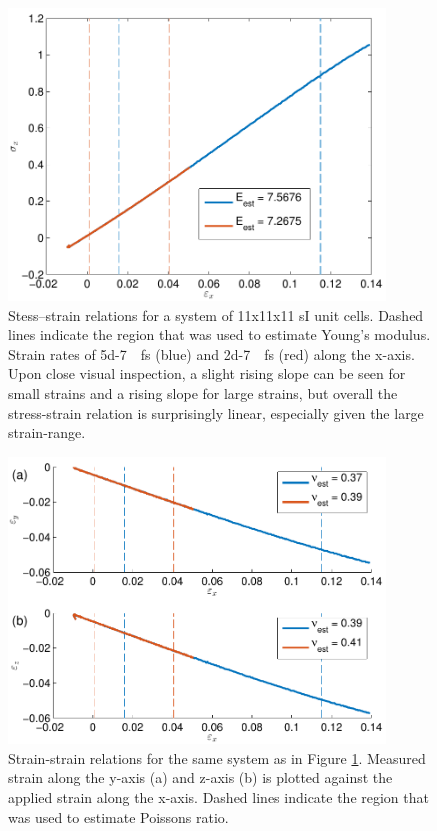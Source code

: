 \begin{figure}
\centering
\includegraphics[width=10cm]{../figures/thesis/stress_strain_11_11_11_tip4p_ice_uam.pdf}
\caption{Stess--strain relations for a system of 11x11x11 sI unit cells. Dashed lines indicate the region that was used to estimate Young's modulus. Strain rates of \SI{5d-7}{\per\femto\second} (blue) and \SI{2d-7}{\per\femto\second} (red) along the x-axis. Upon close visual inspection, a slight rising slope can be seen for small strains and a rising slope for large strains, but overall the stress-strain relation is surprisingly linear, especially given the large strain-range.}
\label{fig:stress_strain_11_11_11_tip4p_ice_uam}

\end{figure}

\begin{figure}
\centering
\includegraphics[width=10cm]{../figures/thesis/strain_strain_11_11_11_y_z_poisson_tip4p_ice_uam.pdf}
\caption{Strain-strain relations for the same system as in Figure \ref{fig:stress_strain_11_11_11_tip4p_ice_uam}. Measured strain along the y-axis (a) and z-axis (b) is plotted against the applied strain along the x-axis. Dashed lines indicate the region that was used to estimate Poissons ratio.}
\label{fig:strain_strain_11_11_11_y_z_poisson_tip4p_ice_uam}

\end{figure}

